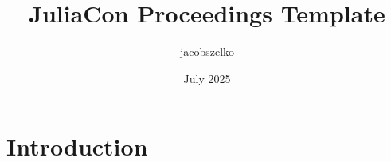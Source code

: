 \documentclass{article}
\title{JuliaCon Proceedings Template}
\author{jacobszelko }
\date{July 2025}
\begin{document}
\maketitle

\section{Introduction}
\end{document}
